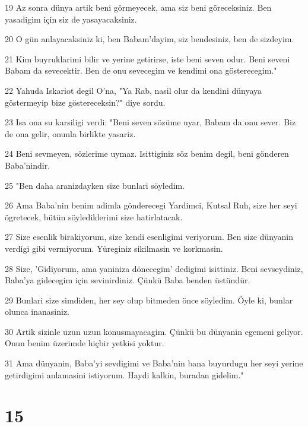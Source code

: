 \par 19 Az sonra dünya artik beni görmeyecek, ama siz beni göreceksiniz. Ben yasadigim için siz de yasayacaksiniz.
\par 20 O gün anlayacaksiniz ki, ben Babam'dayim, siz bendesiniz, ben de sizdeyim.
\par 21 Kim buyruklarimi bilir ve yerine getirirse, iste beni seven odur. Beni seveni Babam da sevecektir. Ben de onu sevecegim ve kendimi ona gösterecegim."
\par 22 Yahuda Iskariot degil O'na, "Ya Rab, nasil olur da kendini dünyaya göstermeyip bize göstereceksin?" diye sordu.
\par 23 Isa ona su karsiligi verdi: "Beni seven sözüme uyar, Babam da onu sever. Biz de ona gelir, onunla birlikte yasariz.
\par 24 Beni sevmeyen, sözlerime uymaz. Isittiginiz söz benim degil, beni gönderen Baba'nindir.
\par 25 "Ben daha aranizdayken size bunlari söyledim.
\par 26 Ama Baba'nin benim adimla gönderecegi Yardimci, Kutsal Ruh, size her seyi ögretecek, bütün söylediklerimi size hatirlatacak.
\par 27 Size esenlik birakiyorum, size kendi esenligimi veriyorum. Ben size dünyanin verdigi gibi vermiyorum. Yüreginiz sikilmasin ve korkmasin.
\par 28 Size, 'Gidiyorum, ama yaniniza dönecegim' dedigimi isittiniz. Beni sevseydiniz, Baba'ya gidecegim için sevinirdiniz. Çünkü Baba benden üstündür.
\par 29 Bunlari size simdiden, her sey olup bitmeden önce söyledim. Öyle ki, bunlar olunca inanasiniz.
\par 30 Artik sizinle uzun uzun konusmayacagim. Çünkü bu dünyanin egemeni geliyor. Onun benim üzerimde hiçbir yetkisi yoktur.
\par 31 Ama dünyanin, Baba'yi sevdigimi ve Baba'nin bana buyurdugu her seyi yerine getirdigimi anlamasini istiyorum. Haydi kalkin, buradan gidelim."

\chapter{15}

